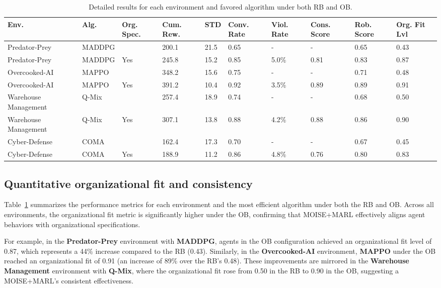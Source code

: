 \documentclass[conference]{IEEEtran}
\begin{document}
\begin{table}[h!]
    \centering
    \caption{Detailed results for each environment and favored algorithm under both RB and OB.}
    \label{tab:detailed_results}
    \small
    \renewcommand{\arraystretch}{1.2}
    \begin{tabular}{p{2cm}p{1.7cm}p{}p{}p{}p{}p{}p{1.7cm}p{1.7cm}p{1.2cm}}
        \hline
        \textbf{Env.} & \textbf{Alg.} & \textbf{Org. Spec.} & \textbf{Cum. Rew.} & \textbf{STD} & \textbf{Conv. Rate} & \textbf{Viol. Rate} & \textbf{Cons. Score} & \textbf{Rob. Score} & \textbf{Org. Fit Lvl} \\ \hline
        Predator-Prey & MADDPG &  & 200.1 & 21.5 & 0.65 & - & - & 0.65 & 0.43 \\
        Predator-Prey & MADDPG & Yes & 245.8 & 15.2 & 0.85 & 5.0\% & 0.81 & 0.83 & 0.87 \\
        Overcooked-AI & MAPPO &  & 348.2 & 15.6 & 0.75 & - & - & 0.71 & 0.48 \\
        Overcooked-AI & MAPPO & Yes & 391.2 & 10.4 & 0.92 & 3.5\% & 0.89 & 0.89 & 0.91 \\
        Warehouse Management & Q-Mix &  & 257.4 & 18.9 & 0.74 & - & - & 0.68 & 0.50 \\
        Warehouse Management & Q-Mix & Yes & 307.1 & 13.8 & 0.88 & 4.2\% & 0.88 & 0.86 & 0.90 \\
        Cyber-Defense & COMA &  & 162.4 & 17.3 & 0.70 & - & - & 0.67 & 0.45 \\
        Cyber-Defense & COMA & Yes & 188.9 & 11.2 & 0.86 & 4.8\% & 0.76 & 0.80 & 0.83 \\ \hline
    \end{tabular}
\end{table}

\subsection{Quantitative organizational fit and consistency}

Table~\ref{tab:detailed_results} summarizes the performance metrics for each environment and the most efficient algorithm under both the RB and OB. Across all environments, the organizational fit metric is significantly higher under the OB, confirming that MOISE+MARL effectively aligns agent behaviors with organizational specifications.

For example, in the \textbf{Predator-Prey} environment with \textbf{MADDPG}, agents in the OB configuration achieved an organizational fit level of 0.87, which represents a 44\% increase compared to the RB (0.43). Similarly, in the \textbf{Overcooked-AI} environment, \textbf{MAPPO} under the OB reached an organizational fit of 0.91 (an increase of 89\% over the RB's 0.48). These improvements are mirrored in the \textbf{Warehouse Management} environment with \textbf{Q-Mix}, where the organizational fit rose from 0.50 in the RB to 0.90 in the OB, suggesting a MOISE+MARL's consistent effectiveness.
\end{document}
